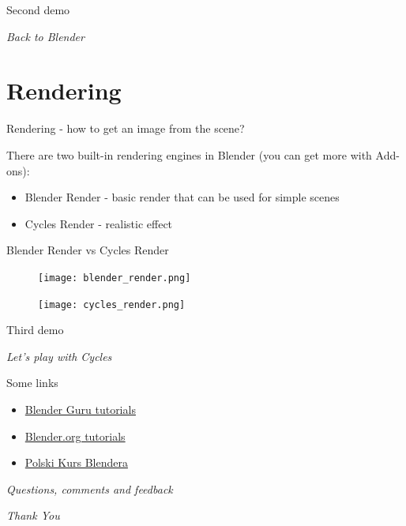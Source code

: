 \documentclass{beamer}
\begin{document}
\begin{frame}{Second demo}

\centering \Huge
\emph{Back to Blender}

\end{frame}

\section{Rendering}

\begin{frame}{Rendering - how to get an image from the scene?}

There are two built-in rendering engines in Blender (you can get more with Add-ons):
\begin{itemize}
\item Blender Render - basic render that can be used for simple scenes
\item Cycles Render - realistic effect
\end{itemize}

\end{frame}

\begin{frame}{Blender Render vs Cycles Render}

\begin{figure}
\texttt{[image: blender\_render.png]}
\end{figure}

\begin{figure}
\texttt{[image: cycles\_render.png]}
\end{figure}

\end{frame}

\begin{frame}{Third demo}

\centering \Huge
\emph{Let's play with Cycles}

\end{frame}


\begin{frame}{Some links}

\begin{itemize}
\item \href{https://www.blenderguru.com/}{Blender Guru tutorials}
\item \href{https://www.blender.org/support/tutorials/}{Blender.org tutorials}
\item \href{http://polskikursblendera.pl/}{Polski Kurs Blendera}
\end{itemize}

\end{frame}

\begin{frame}{}
  \centering \Huge
  \emph{Questions, comments and feedback}
\end{frame}

\begin{frame}{}
  \centering \Huge
  \emph{Thank You}
\end{frame}
\end{document}
